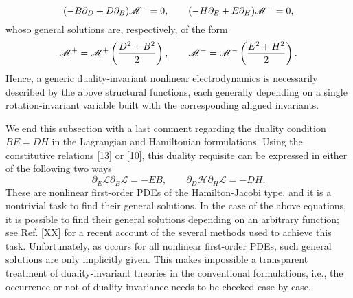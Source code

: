 \begin{equation}\label{24}
  (-B\partial_D+D\partial_B)\mathscr{M}^+=0,\qquad (-H\partial_E+E\partial_H)\mathscr{M}^-=0,
\end{equation}
whoso general solutions are, respectively, of the form
\begin{equation}\label{25}
  \mathscr{M}^+=\mathscr{M}^+\left(\frac{D^2+B^2}{2}\right),\qquad \mathscr{M}^-=\mathscr{M}^-\left(\frac{E^2+H^2}{2}\right). 
\end{equation}
Hence, a generic duality-invariant nonlinear electrodynamics is necessarily described by the above structural functions, each generally depending on a single rotation-invariant variable built with the corresponding aligned invariants.

We end this subsection with a last comment regarding the duality condition $BE = DH$ in the Lagrangian and Hamiltonian formulations. Using the constitutive relations \eqref{13} or \eqref{10}, this duality requisite can be expressed in either of the following two ways
\begin{equation}\label{26}
  \partial_E\mathscr{L}\partial_B \mathscr{L}=-EB,\qquad \partial_D\mathscr{H}\partial_H \mathscr{L}=-DH.
\end{equation}
These are nonlinear first-order PDEs of the Hamilton-Jacobi type, and it is a nontrivial task to find their general solutions. In the case of the above equations, it is possible to find their general solutions depending on an arbitrary function; see Ref. [XX] for a recent account of the several methods used to achieve this task. Unfortunately, as occurs for all nonlinear first-order PDEs, such general solutions are only implicitly given. This makes impossible a transparent treatment of duality-invariant theories in the conventional formulations, i.e., the occurrence or not of duality invariance needs to be checked case by case.






























